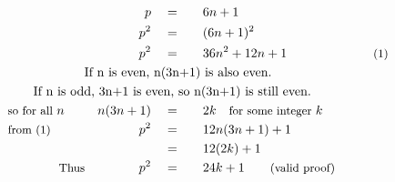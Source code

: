 \begin{alignat*}{5}
&\,&p\quad&=\quad&&6n+1\\
&\,&p^2\quad&=&&(6n+1)^2\\
&\,&p^2\quad&=&&36n^2+12n+1&&\qquad\small\text{(1)}\\
&\qquad\qquad\qquad\rlap{\text{If }n\text{ is even, }n(3n+1)\text{ is also even.}}\\
&\qquad\rlap{\text{If }n\text{ is odd, }3n+1\text{ is even, so }n(3n+1)\text{ is still even.}}\\
&\small\text{so for all }n\normalsize\quad&n(3n+1)\quad&=&&2k\quad\small\text{for some integer }k\\
&\small\text{from (1)}&p^2\quad&=&&12n(3n+1)+1\\
&\,&\,&=&&12(2k)+1\\
&\qquad\qquad\small\text{Thus}&p^2\quad&=&&24k+1\qquad\small\text{(valid proof)}
\end{alignat*}
